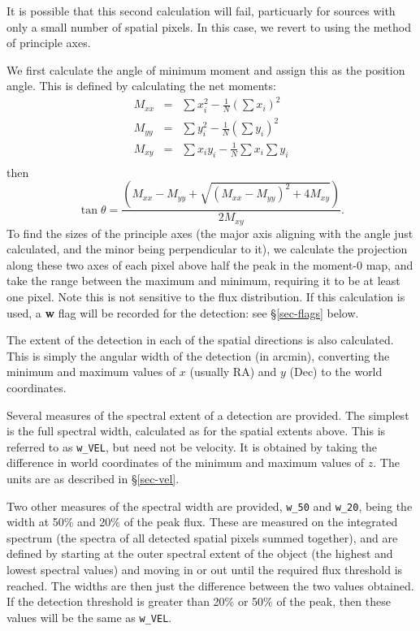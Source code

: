 It is possible that this second calculation will fail, particuarly for
sources with only a small number of spatial pixels. In this case, we
revert to using the method of principle axes. 

We first calculate the angle of minimum moment and assign this as the
position angle. This is defined by calculating the net moments:
\begin{eqnarray*}
M_{xx} &= & \sum x_i^2 - \frac{1}{N} \left(\sum x_i\right)^2\\
M_{yy} &= & \sum y_i^2 - \frac{1}{N} \left(\sum y_i\right)^2\\
M_{xy} &= & \sum x_i y_i - \frac{1}{N} \sum x_i \sum y_i\\
\end{eqnarray*}
then
\[
\tan \theta = \frac{(M_{xx} - M_{yy} + \sqrt{(M_{xx}-M_{yy})^2+4M_{xy}})}{2M_{xy}}.
\]
To find the sizes of the principle axes (the major axis aligning with
the angle just calculated, and the minor being perpendicular to it),
we calculate the projection along these two axes of each pixel above
half the peak in the moment-0 map, and take the range between the
maximum and minimum, requiring it to be at least one pixel. Note this
is not sensitive to the flux distribution. If this calculation is
used, a \textbf{w} flag will be recorded for the detection: see
\S\ref{sec-flags} below.



The extent of the detection in each of the spatial directions is also
calculated. This is simply the angular width of the detection (in
arcmin), converting the minimum and maximum values of $x$ (usually RA)
and $y$ (Dec) to the world coordinates.


Several measures of the spectral extent of a detection are
provided. The simplest is the full spectral width, calculated as for
the spatial extents above. This is referred to as \texttt{w\_VEL}, but
need not be velocity. It is obtained by taking the difference in world
coordinates of the minimum and maximum values of $z$. The units are as
described in \S\ref{sec-vel}.

Two other measures of the spectral width are provided, \texttt{w\_50}
and \texttt{w\_20}, being the width at 50\% and 20\% of the peak
flux. These are measured on the integrated spectrum (\ie the spectra
of all detected spatial pixels summed together), and are defined by
starting at the outer spectral extent of the object (the highest and
lowest spectral values) and moving in or out until the required flux
threshold is reached. The widths are then just the difference between
the two values obtained. If the detection threshold is greater than
20\% or 50\% of the peak, then these values will be the same as
\texttt{w\_VEL}.

